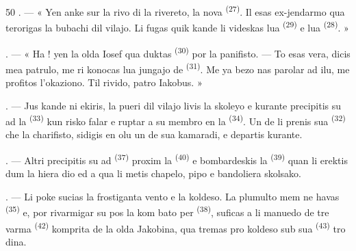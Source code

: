 \begin{VUpage}[52]{50}
. --- « Yen anke sur la rivo di la rivereto,\nl
la nova  \textsuperscript{(27)}. Il esas ex-jendarmo\nl
qua terorigas la bubachi dil vilajo. Li fugas\nl
quik kande li videskas lua  \textsuperscript{(29)} e lua \cc
{} \textsuperscript{(28)}. »

. --- « Ha ! yen la olda Iosef qua duktas\nl
{} \textsuperscript{(30)} por la panifisto.\nl
--- To esas vera, dicis mea patrulo, me ri\cc
konocas lua jungajo de  \textsuperscript{(31)}. Me ya bezo\cc
nas parolar ad ilu, me profitos l'okaziono. Til\nl
rivido, patro Iakobus. »

. --- Jus kande ni ekiris, la pueri dil\nl
vilajo livis la skoleyo e kurante precipitis su\nl
ad la  \textsuperscript{(33)} kun risko falar e ruptar a su\nl
membro en la  \textsuperscript{(34)}. Un de li prenis sua\nl
{} \textsuperscript{(32)} che la charifisto, sidigis en olu\nl
un de sua kamaradi, e departis kurante.

. --- Altri precipitis su ad  \textsuperscript{(37)}\nl
proxim la  \textsuperscript{(40)} e bombardeskis la \nl
{} \textsuperscript{(39)} quan li erektis dum la hiera dio ed\nl
a qua li metis chapelo, pipo e bandoliera\nl
skolsako.

. --- Li poke sucias la frostiganta vento e\nl
la koldeso. La plumulto mem ne havas \cc
{} \textsuperscript{(35)} e, por rivarmigar su pos la kom\cc
bato per  \textsuperscript{(38)}, suficas a li manuedo de\nl
tre varma  \textsuperscript{(42)} komprita de la olda\nl
{} Jakobina, qua tremas pro koldeso\nl
sub sua  \textsuperscript{(43)} tro dina.
\end{VUpage}

